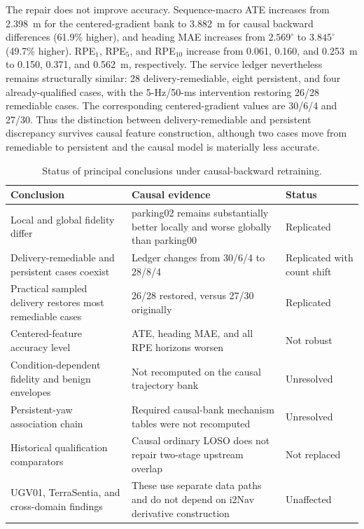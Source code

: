 \documentclass[journal,onecolumn]{IEEEtran}
\begin{document}
The repair does not improve accuracy. Sequence-macro ATE increases from 2.398~m for the centered-gradient bank to 3.882~m for causal backward differences (61.9\% higher), and heading MAE increases from $2.569^\circ$ to $3.845^\circ$ (49.7\% higher). RPE$_1$, RPE$_5$, and RPE$_{10}$ increase from 0.061, 0.160, and 0.253~m to 0.150, 0.371, and 0.562~m, respectively. The service ledger nevertheless remains structurally similar: 28 delivery-remediable, eight persistent, and four already-qualified cases, with the 5-Hz/50-ms intervention restoring 26/28 remediable cases. The corresponding centered-gradient values are 30/6/4 and 27/30. Thus the distinction between delivery-remediable and persistent discrepancy survives causal feature construction, although two cases move from remediable to persistent and the causal model is materially less accurate.

\begin{table}[ht]\centering
\caption{Status of principal conclusions under causal-backward retraining.}
\begin{tabular}{p{.30\linewidth}p{.44\linewidth}p{.16\linewidth}}
\toprule
Conclusion & Causal evidence & Status \\
\midrule
Local and global fidelity differ & parking02 remains substantially better locally and worse globally than parking00 & Replicated \\
Delivery-remediable and persistent cases coexist & Ledger changes from 30/6/4 to 28/8/4 & Replicated with count shift \\
Practical sampled delivery restores most remediable cases & 26/28 restored, versus 27/30 originally & Replicated \\
Centered-feature accuracy level & ATE, heading MAE, and all RPE horizons worsen & Not robust \\
Condition-dependent fidelity and benign envelopes & Not recomputed on the causal trajectory bank & Unresolved \\
Persistent-yaw association chain & Required causal-bank mechanism tables were not recomputed & Unresolved \\
Historical qualification comparators & Causal ordinary LOSO does not repair two-stage upstream overlap & Not replaced \\
UGV01, TerraSentia, and cross-domain findings & These use separate data paths and do not depend on i2Nav derivative construction & Unaffected \\
\bottomrule
\end{tabular}
\end{table}
\end{document}
